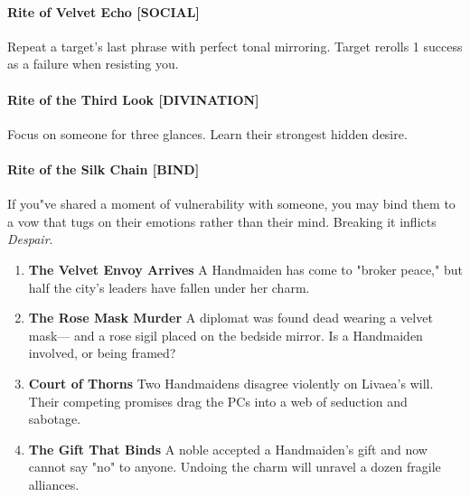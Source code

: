 \documentclass[11pt]{book}
\begin{document}
\paragraph{Rite of Velvet Echo [SOCIAL]}
Repeat a target's last phrase with perfect tonal mirroring.  
Target rerolls 1 success as a failure when resisting you.

\paragraph{Rite of the Third Look [DIVINATION]}
Focus on someone for three glances.  
Learn their strongest hidden desire.

\paragraph{Rite of the Silk Chain [BIND]}
If you"ve shared a moment of vulnerability with someone,  
you may bind them to a vow that tugs on their emotions  
rather than their mind. Breaking it inflicts \emph{Despair}.

\begin{enumerate}[leftmargin=*]
    \item \textbf{The Velvet Envoy Arrives}  
    A Handmaiden has come to "broker peace,"  
    but half the city's leaders have fallen under her charm.

    \item \textbf{The Rose Mask Murder}  
    A diplomat was found dead wearing a velvet mask---  
    and a rose sigil placed on the bedside mirror.  
    Is a Handmaiden involved, or being framed?

    \item \textbf{Court of Thorns}  
    Two Handmaidens disagree violently on Livaea's will.  
    Their competing promises drag the PCs into a web of seduction and sabotage.

    \item \textbf{The Gift That Binds}  
    A noble accepted a Handmaiden's gift and now cannot say "no" to anyone.  
    Undoing the charm will unravel a dozen fragile alliances.
\end{enumerate}
\end{document}
